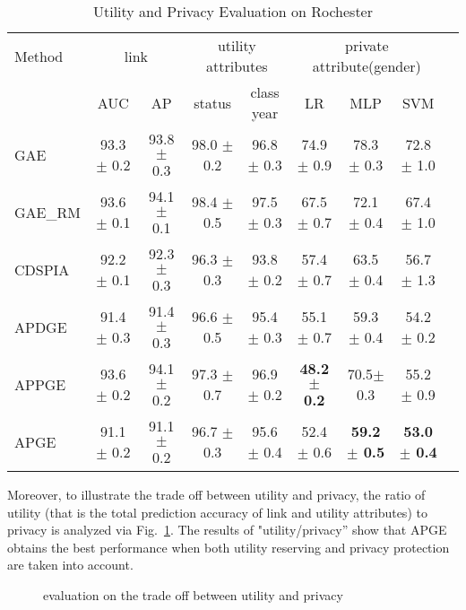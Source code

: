 \documentclass{article}
\begin{document}
%
\begin{table}
\small
  \caption{Utility and Privacy Evaluation on Rochester}
  \label{Tab:Rochester}
  \centering
  \begin{tabular}{lcccccccc}
    \toprule
     Method & \multicolumn{2}{c}{link} & \multicolumn{2}{c}{utility attributes} &\multicolumn{3}{c}{private attribute(gender)}                  \\
    \cmidrule(r){2-3} \cmidrule(r){4-5} \cmidrule(r){6-8}
       & AUC  &AP     &status &class year  &LR  &MLP &SVM  \\
    \midrule
    GAE   &93.3 $\pm$ 0.2  &93.8 $\pm$ 0.3 &98.0 $\pm$ 0.2 &96.8 $\pm$ 0.3 &74.9 $\pm$ 0.9 &78.3 $\pm$ 0.3 &72.8 $\pm$ 1.0\\
    GAE\_RM  &93.6 $\pm$  0.1 &94.1 $\pm$ 0.1 &98.4 $\pm$ 0.5 &97.5 $\pm$  0.3 &67.5 $\pm$ 0.7 &72.1 $\pm$ 0.4 &67.4 $\pm$ 1.0\\
    CDSPIA  &92.2 $\pm$ 0.1 &92.3 $\pm$ 0.3 &96.3 $\pm$  0.3 &93.8 $\pm$ 0.2 &57.4 $\pm$ 0.7 &63.5 $\pm$ 0.4 &56.7 $\pm$ 1.3\\
    APDGE     &91.4 $\pm$ 0.3 &91.4 $\pm$ 0.3 &96.6 $\pm$ 0.5 &95.4 $\pm$ 0.3 &55.1 $\pm$ 0.7 &59.3  $\pm$ 0.4 &54.2 $\pm$ 0.2\\
    APPGE     &93.6 $\pm$ 0.2 &94.1 $\pm$ 0.2 &97.3  $\pm$ 0.7 &96.9 $\pm$ 0.2  &\textbf{48.2 $\pm$  0.2}   &70.5$\pm$  0.3 &55.2 $\pm$ 0.9\\
    APGE     &91.1  $\pm$ 0.2 &91.1 $\pm$ 0.2 &96.7 $\pm$ 0.3 &95.6 $\pm$ 0.4 &52.4 $\pm$ 0.6 &\textbf{59.2 $\pm$ 0.5} &\textbf{53.0 $\pm$ 0.4}\\
    \bottomrule
  \end{tabular}
\end{table}


Moreover, to illustrate the trade off between utility and privacy, the ratio of utility (that is the total prediction accuracy of link and utility attributes) to privacy is analyzed via Fig.~\ref{fig:u_p}. The results of "utility/privacy'' show that APGE obtains the best performance when both utility reserving and privacy protection are taken into account.
%
\begin{figure}[!ht]
     \hfill
     \caption{evaluation on the trade off between utility and privacy}
     \label{fig:u_p}
   \end{figure}
\end{document}
